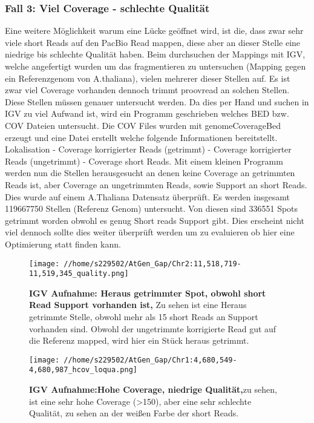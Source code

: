 \documentclass{scrartcl}
\begin{document}
\subsubsection{Fall 3: Viel Coverage - schlechte Qualität}
\label{sec-7-4-3}
Eine weitere Möglichkeit warum eine Lücke geöffnet wird, ist die, dass zwar sehr viele short Reads auf den PacBio Read mappen, diese aber an dieser Stelle
eine niedrige bis schlechte Qualität haben. Beim durchsuchen der Mappings mit IGV, welche angefertigt wurden um das fragmentieren zu untersuchen (Mapping gegen ein Referenzgenom von A.thaliana), vielen mehrerer 
dieser Stellen auf. Es ist zwar viel Coverage vorhanden dennoch trimmt proovread an solchen Stellen. Diese Stellen müssen genauer untersucht werden. Da dies
per Hand und suchen in IGV zu viel Aufwand ist, wird ein Programm geschrieben welches BED bzw. COV Dateien untersucht. Die COV Files wurden mit genomeCoverageBed erzeugt
und eine Datei erstellt welche folgende Informationen bereitstellt. Lokalisation - Coverage korrigierter Reads (getrimmt) - Coverage korrigierter Reads (ungetrimmt) - Coverage 
short Reads. Mit einem kleinen Programm werden nun die Stellen herausgesucht an denen keine Coverage an getrimmten Reads ist, aber Coverage an ungetrimmten Reads, sowie 
Support an short Reads. Dies wurde auf einem A.Thaliana Datensatz überprüft. Es werden insgesamt 119667750 Stellen (Referenz Genom) untersucht. Von diesen sind 336551 Spots 
getrimmt worden obwohl es genug Short reads Support gibt. Dies erscheint nicht viel dennoch sollte dies weiter überprüft werden um zu evaluieren ob hier eine Optimierung statt finden kann.
\begin{figure}
\texttt{[image: //home/s229502/AtGen\_Gap/Chr2:11,518,719-11,519,345\_quality.png]} 
\caption[IGV Aufnahme: Heraus getrimmter Spot, obwohl short Reads Support vorhanden ist.]{\textbf{IGV Aufnahme: Heraus getrimmter Spot, obwohl short Read Support vorhanden ist,} Zu sehen ist eine Heraus getrimmte Stelle, obwohl mehr als 15 short Reads an Support vorhanden sind. Obwohl der ungetrimmte korrigierte Read gut auf die Referenz mapped, wird hier ein Stück heraus getrimmt.}
\end{figure}

\begin{figure}
\texttt{[image: //home/s229502/AtGen\_Gap/Chr1:4,680,549-4,680,987\_hcov\_loqua.png]} 
\caption[IGV Aufnahme: Hohe Coverage, niedrige Qualität]{\textbf{IGV Aufnahme:Hohe Coverage, niedrige Qualität,}zu sehen, ist eine sehr hohe Coverage (>150), aber eine sehr schlechte Qualität, zu sehen an der weißen Farbe der short Reads. }
\end{figure}
\clearpage
\end{document}
